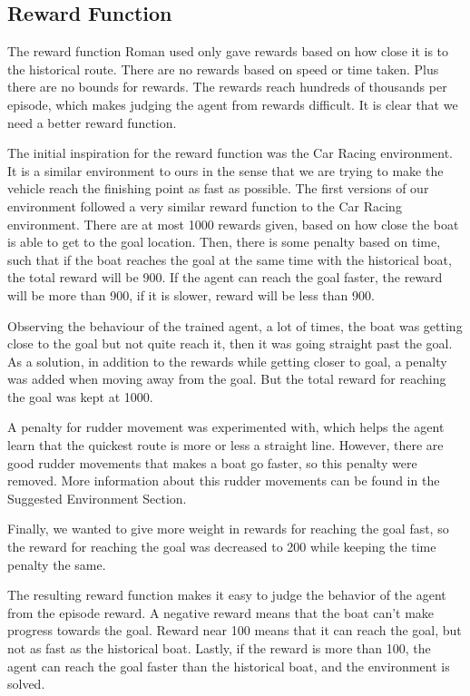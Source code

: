 \documentclass[12pt,twoside]{report}
\begin{document}
\subsection{Reward Function}
The reward function Roman used only gave rewards based on how close it is to the historical route. There are no rewards based on speed or time taken. Plus there are no bounds for rewards. The rewards reach hundreds of thousands per episode, which makes judging the agent from rewards difficult. It is clear that we need a better reward function.

The initial inspiration for the reward function was the Car Racing \cite{CarRacing-v0} environment. It is a similar environment to ours in the sense that we are trying to make the vehicle reach the finishing point as fast as possible. The first versions of our environment followed a very similar reward function to the Car Racing environment. There are at most 1000 rewards given, based on how close the boat is able to get to the goal location. Then, there is some penalty based on time, such that if the boat reaches the goal at the same time with the historical boat, the total reward will be 900. If the agent can reach the goal faster, the reward will be more than 900, if it is slower, reward will be less than 900.

Observing the behaviour of the trained agent, a lot of times, the boat was getting close to the goal but not quite reach it, then it was going straight past the goal. As a solution, in addition to the rewards while getting closer to goal, a penalty was added when moving away from the goal. But the total reward for reaching the goal was kept at 1000.

A penalty for rudder movement was experimented with, which helps the agent learn that the quickest route is more or less a straight line. However, there are good rudder movements that makes a boat go faster, so this penalty were removed. More information about this rudder movements can be found in the Suggested Environment Section.

Finally, we wanted to give more weight in rewards for reaching the goal fast, so the reward for reaching the goal was decreased to 200 while keeping the time penalty the same. 

The resulting reward function makes it easy to judge the behavior of the agent from the episode reward. A negative reward means that the boat can't make progress towards the goal. Reward near 100 means that it can reach the goal, but not as fast as the historical boat. Lastly, if the reward is more than 100, the agent can reach the goal faster than the historical boat, and the environment is solved.
\end{document}

